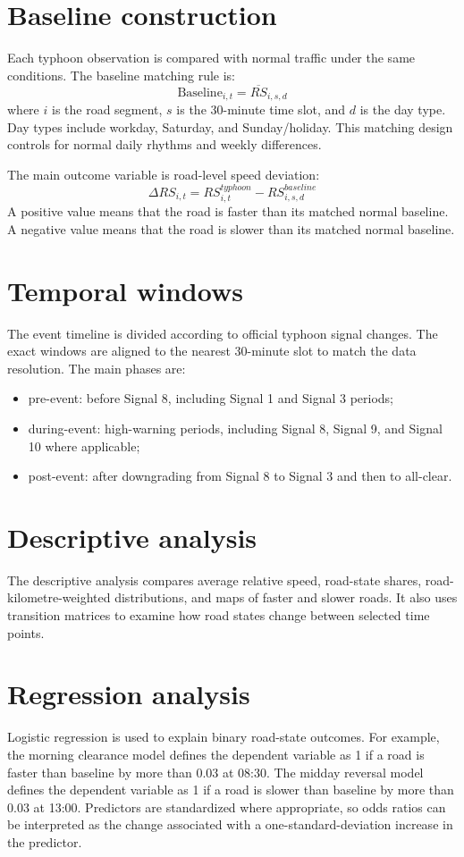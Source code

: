 \documentclass[12pt,a4paper]{report}
\begin{document}
\section{Baseline construction}
Each typhoon observation is compared with normal traffic under the same conditions. The baseline matching rule is:
\begin{equation}
\text{Baseline}_{i,t} = \overline{RS}_{i,s,d}
\end{equation}
where $i$ is the road segment, $s$ is the 30-minute time slot, and $d$ is the day type. Day types include workday, Saturday, and Sunday/holiday. This matching design controls for normal daily rhythms and weekly differences.

The main outcome variable is road-level speed deviation:
\begin{equation}
\Delta RS_{i,t} = RS_{i,t}^{typhoon} - RS_{i,s,d}^{baseline}
\end{equation}
A positive value means that the road is faster than its matched normal baseline. A negative value means that the road is slower than its matched normal baseline.

\section{Temporal windows}
The event timeline is divided according to official typhoon signal changes. The exact windows are aligned to the nearest 30-minute slot to match the data resolution. The main phases are:
\begin{itemize}
  \item pre-event: before Signal 8, including Signal 1 and Signal 3 periods;
  \item during-event: high-warning periods, including Signal 8, Signal 9, and Signal 10 where applicable;
  \item post-event: after downgrading from Signal 8 to Signal 3 and then to all-clear.
\end{itemize}

\section{Descriptive analysis}
The descriptive analysis compares average relative speed, road-state shares, road-kilometre-weighted distributions, and maps of faster and slower roads. It also uses transition matrices to examine how road states change between selected time points.

\section{Regression analysis}
Logistic regression is used to explain binary road-state outcomes. For example, the morning clearance model defines the dependent variable as 1 if a road is faster than baseline by more than 0.03 at 08:30. The midday reversal model defines the dependent variable as 1 if a road is slower than baseline by more than 0.03 at 13:00. Predictors are standardized where appropriate, so odds ratios can be interpreted as the change associated with a one-standard-deviation increase in the predictor.
\end{document}
